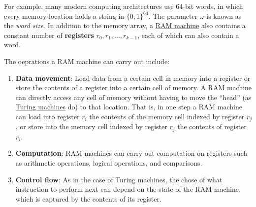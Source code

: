   For example, many modern computing architectures use 64-bit words, in which every memory location holds a string in $\{0,1\}^{64}$. The parameter $\omega$ is known as the \textit{word size}. In addition to the memory array, a \hyperref[def:ram-machine]{RAM machine} also contains a constant number of \textbf{registers} $r_0, r_1, ..., r_{k-1}$, each of which can also contain a word. 

  The oeprations a RAM machine can carry out include: 
  \begin{enumerate}
      \item \textbf{Data movement}: Load data from a certain cell in memory into a register or store the contents of a register into a certain cell of memory. A RAM machine can directly access any cell of memory without having to move the “head” (as \hyperref[def:turing-machine]{Turing machines} do) to that location. That is, in one step a RAM machine can load into register $r_i$ the contents of the memory cell indexed by register $r_j$, or store into the memory cell indexed by register $r_j$ the contents of register $r_i$. 
      \item \textbf{Computation}: RAM machines can carry out computation on registers such as arithmetic operations, logical operations, and comparisons. 
      \item \textbf{Control flow}: As in the case of Turing machines, the chose of what instruction to perform next can depend on the state of the RAM machine, which is captured by the contents of its register. 
  \end{enumerate}

